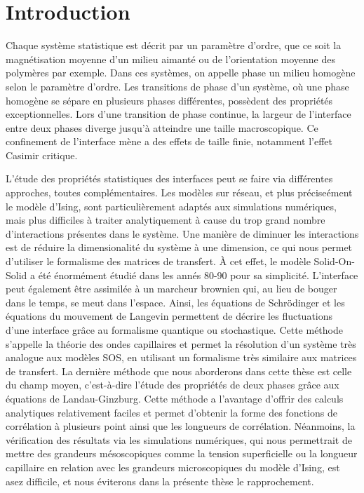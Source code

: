 \chapter*{Introduction}

Chaque système statistique est décrit par un paramètre d'ordre, que ce soit la magnétisation moyenne d'un milieu aimanté ou de l'orientation moyenne des polymères par exemple. Dans ces systèmes, on appelle phase un milieu homogène selon le paramètre d'ordre. Les transitions de phase d'un système, où une phase homogène se sépare en plusieurs phases différentes, possèdent des propriétés exceptionnelles. Lors d'une transition de phase continue, la largeur de l'interface entre deux phases diverge jusqu'à atteindre une taille macroscopique. Ce confinement de l'interface mène a des effets de taille finie, notamment l'effet Casimir critique.

L'étude des propriétés statistiques des interfaces peut se faire via différentes approches, toutes complémentaires. Les modèles sur réseau, et plus préciseément le modèle d'Ising, sont particulièrement adaptés aux simulations numériques, mais plus difficiles à traiter analytiquement à cause du trop grand nombre d'interactions présentes dans le système. Une manière de diminuer les interactions est de réduire la dimensionalité du système à une dimension, ce qui nous permet d'utiliser le formalisme des matrices de transfert. À cet effet, le modèle Solid-On-Solid a été énormément étudié dans les annés 80-90 pour sa simplicité.
L'interface peut également être assimilée à un marcheur brownien qui, au lieu de bouger dans le temps, se meut dans l'espace. Ainsi, les équations de Schrödinger et les équations du mouvement de Langevin permettent de décrire les fluctuations d'une interface grâce au formalisme quantique ou stochastique. Cette méthode s'appelle la théorie des ondes capillaires et permet la résolution d'un système très analogue aux modèles SOS, en utilisant un formalisme très similaire aux matrices de transfert. 
La dernière méthode que nous aborderons dans cette thèse est celle du champ moyen, c'est-à-dire l'étude des propriétés de deux phases grâce aux équations de Landau-Ginzburg. Cette méthode a l'avantage d'offrir des calculs analytiques relativement faciles et permet d'obtenir la forme des fonctions de corrélation à plusieurs point ainsi que les longueurs de corrélation. Néanmoins, la vérification des résultats via les simulations numériques, qui nous permettrait de mettre des grandeurs mésoscopiques comme la tension superficielle ou la longueur capillaire en relation avec les grandeurs microscopiques du modèle d'Ising, est asez difficile, et nous éviterons dans la présente thèse le rapprochement.

